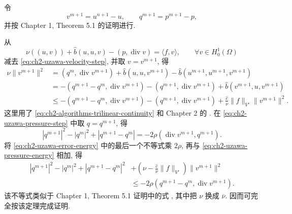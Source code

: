 \begin{Proof}
令
\begin{equation}
v^{m+1}=u^{n+1}-u,
\qquad
q^{m+1}=p^{m+1}-p,
\label{eq:ch2-uzawa-error-variables}
\end{equation}
并按 Chapter 1, Theorem 5.1 的证明进行.

从
\begin{equation}
\nu((u,v))+\widehat b(u,u,v)-(p,\operatorname{div}v)
=\langle f,v\rangle,
\qquad\forall v\in H_0^1(\Omega)
\label{eq:ch2-uzawa-exact-equation}
\end{equation}
减去 \eqref{eq:ch2-uzawa-velocity-step}, 并取 $v=v^{m+1}$, 得
\begin{equation}
\begin{aligned}
\nu\lVert v^{m+1}\rVert^2
&=(q^m,\operatorname{div}v^{m+1})
+\widehat b(u,u,v^{m+1})
-\widehat b(u^{m+1},u^{m+1},v^{m+1})\\
&=-(q^{m+1}-q^m,\operatorname{div}v^{m+1})
-(q^{m+1},\operatorname{div}v^{m+1})
+\widehat b(v^{m+1},u,v^{m+1})\\
&\leq-(q^{m+1}-q^m,\operatorname{div}v^{m+1})
-(q^{m+1},\operatorname{div}v^{m+1})
+\frac{\widehat c}\nu\lVert f\rVert_{V'}\lVert v^{m+1}\rVert^2.
\end{aligned}
\label{eq:ch2-uzawa-error-energy}
\end{equation}
这里用了 \eqref{eq:ch2-algorithms-trilinear-continuity} 和 Chapter 2 的 . 在 \eqref{eq:ch2-uzawa-pressure-step} 中取 $q=q^{m+1}$, 得
\begin{equation}
|q^{m+1}|^2-|q^m|^2+|q^{m+1}-q^m|
=-2\rho(\operatorname{div}v^{m+1},q^{m+1}).
\label{eq:ch2-uzawa-pressure-energy}
\end{equation}
将 \eqref{eq:ch2-uzawa-error-energy} 中的最后一个不等式乘 $2\rho$, 再与 \eqref{eq:ch2-uzawa-pressure-energy} 相加, 得
\begin{equation}
\begin{aligned}
|q^{m+1}|^2-|q^m|^2+|q^{m+1}-q^m|^2
&+\left(\nu-\frac{\widehat c}\nu\lVert f\rVert_{V'}\right)
\lVert v^{m+1}\rVert^2\\
&\leq-2\rho(q^{m+1}-q^m,\operatorname{div}v^{m+1}).
\end{aligned}
\label{eq:ch2-uzawa-combined-energy}
\end{equation}
该不等式类似于 Chapter 1, Theorem 5.1 证明中的式 , 其中把 $\nu$ 换成 $\overline\nu$. 因而可完全按该定理完成证明.
\end{Proof}

